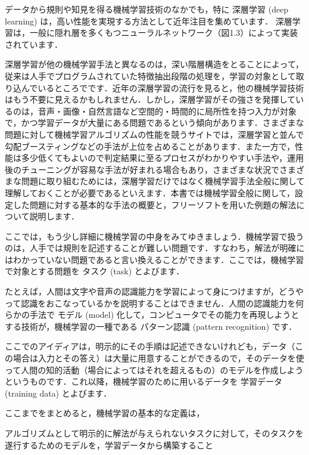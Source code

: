 
データから規則や知見を得る機械学習技術のなかでも，特に
深層学習 (deep learning)
は，高い性能を実現する方法として近年注目を集めています．
深層学習は，一般に隠れ層を多くもつニューラルネットワーク（図1.3）によって実装されています．

深層学習が他の機械学習手法と異なるのは，深い階層構造をとることによって，従来は人手でプログラムされていた特徴抽出段階の処理を，学習の対象として取り込んでいるところでです．近年の深層学習の流行を見ると，他の機械学習技術はもう不要に見えるかもしれません．しかし，深層学習がその強さを発揮しているのは，音声・画像・自然言語など空間的・時間的に局所性を持つ入力が対象で，かつ学習データが大量にある問題であるという傾向があります．さまざまな問題に対して機械学習アルゴリズムの性能を競うサイトでは，深層学習と並んで勾配ブースティングなどの手法が上位を占めることがあります．また一方で，性能は多少低くてもよいので判定結果に至るプロセスがわかりやすい手法や，運用後のチューニングが容易な手法が好まれる場合もあり，さまざまな状況でさまざまな問題に取り組むためには，深層学習だけではなく機械学習手法全般に関して理解しておくことが必要であるといえます．本書では機械学習全般に関して，設定した問題に対する基本的な手法の概要と，フリーソフトを用いた例題の解法について説明します．


ここでは，もう少し詳細に機械学習の中身をみてゆきましょう．機械学習で扱うのは，人手では規則を記述することが難しい問題です．すなわち，解法が明確にはわかっていない問題であると言い換えることができます．ここでは，機械学習で対象とする問題を
タスク (task)
とよびます．

たとえば，人間は文字や音声の認識能力を学習によって身につけますが，どうやって認識をおこなっているかを説明することはできません．人間の認識能力を何らかの手法で
モデル (model)
化して，コンピュータでその能力を再現しようとする技術が，機械学習の一種である
パターン認識 (pattern recognition) 
です．

ここでのアイディアは，明示的にその手順は記述できないけれども，データ（この場合は入力とその答え）は大量に用意することができるので，そのデータを使って人間の知的活動（場合によってはそれを超えるもの）のモデルを作成しようというものです．これ以降，機械学習のために用いるデータを
学習データ (training data)
とよびます．

ここまでをまとめると，機械学習の基本的な定義は，

アルゴリズムとして明示的に解法が与えられないタスクに対して，そのタスクを遂行するためのモデルを，学習データから構築すること


